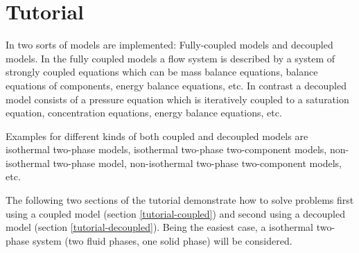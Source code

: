 \chapter[Tutorial]{Tutorial}\label{chp:tutorial}

In \Dumux two sorts of models are implemented: Fully-coupled models and decoupled models. In the fully coupled models a flow system is described by a system of strongly coupled equations which can be mass balance equations, balance equations of components, energy balance equations, etc. In contrast a decoupled model consists of a pressure equation which is iteratively coupled to a saturation equation, concentration equations, energy balance equations, etc.

Examples for different kinds of both coupled and decoupled models are isothermal two-phase models, isothermal two-phase two-component models, non-isothermal two-phase model, non-isothermal two-phase two-component models, etc.

The following two sections of the tutorial demonstrate how to solve problems first using a coupled model (section \ref{tutorial-coupled}) and second using a decoupled model (section \ref{tutorial-decoupled}). Being the easiest case, a isothermal two-phase system (two fluid phases, one solid phase) will be considered.


%